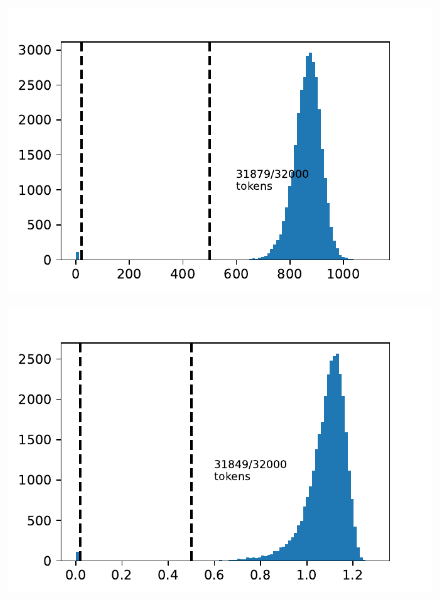 \begin{figure}[H]
\centering
\begin{minipage}{.25\textwidth}
\centering
    \label{fig:initial-layer1-norm}
    \includegraphics[width=\textwidth]{Figures/initial_token/token_0_layer_1_out_norms.pdf}
\end{minipage}
\begin{minipage}{.25\textwidth}
    \centering
    \label{fig:initial-embed-norm}
    \includegraphics[width=\textwidth]{Figures/initial_token/token_0_embed_norms.pdf}
\end{minipage}

\end{figure}
